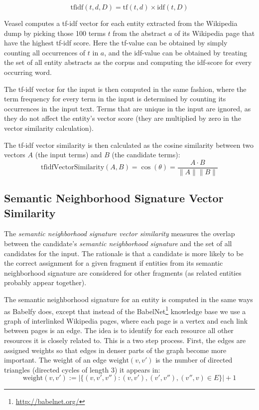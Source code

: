 \documentclass[runningheads,a4paper]{llncs}
\begin{document}
{$$ \mathrm{tfidf}(t, d, D) = \mathrm{tf}(t, d) \times \mathrm{idf}(t, D) $$

Veasel computes a tf-idf vector for each entity extracted from the Wikipedia dump by picking those 100 terms $t$ from the abstract $a$ of its Wikipedia page that have the highest tf-idf score. Here the tf-value can be obtained by simply counting all occurrences of $t$ in $a$, and the idf-value can be obtained by treating the set of all entity abstracts as the corpus and computing the idf-score for every occurring word. 

The tf-idf vector for the input is then computed in the same fashion, where the term frequency for every term in the input is determined by counting its occurrences in the input text. Terms that are unique in the input are ignored, as they do not affect the entity's vector score (they are multiplied by zero in the vector similarity calculation).

The tf-idf vector similarity is then calculated as the cosine similarity between two vectors $A$ (the input terms) and $B$ (the candidate terms):
$$\mathrm{tfidfVectorSimilarity}(A, B) = \cos(\theta) = \frac{A \cdot B}{\|A\| \|B\|}$$

\subsection{Semantic Neighborhood Signature Vector Similarity}

The \emph{semantic neighborhood signature vector similarity} measures the overlap between the candidate's \emph{semantic neighborhood signature} and the set of all candidates for the input. The rationale is that a candidate is more likely to be the correct assignment for a given fragment if entities from its semantic neighborhood signature are considered for other fragments (as related entities probably appear together).

The semantic neighborhood signature for an entity is computed in the same ways as Babelfy \cite{babelfy} does, except that instead of the BabelNet\footnote{\url{http://babelnet.org/}} knowledge base we use a graph of interlinked Wikipedia pages, where each page is a vertex and each link between pages is an edge. The idea is to identify for each resource all other resources it is closely related to. This is a two step process. First, the edges are assigned weights so that edges in denser parts of the graph become more important. The weight of an edge $\mathrm{weight}(v, v')$ is the number of directed triangles (directed cycles of length 3) it appears in:
$$\mathrm{weight}(v, v') := |\{(v, v', v'') : (v, v'), (v', v''), (v'', v) \in E\}| + 1$$

}
\end{document}
